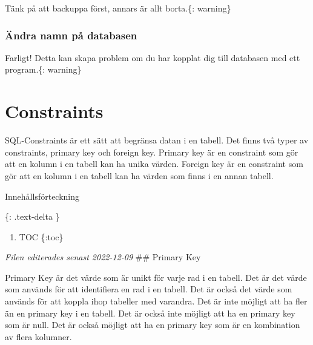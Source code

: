 Tänk på att backuppa först, annars är allt borta.\{: warning\}

\hypertarget{cb3}{}
\begin{Shaded}
\begin{Highlighting}[]
 
\end{Highlighting}
\end{Shaded}

\hypertarget{uxe4ndra-namn-puxe5-databasen}{%
\subsubsection{Ändra namn på
databasen}\label{uxe4ndra-namn-puxe5-databasen}}

Farligt! Detta kan skapa problem om du har kopplat dig till databasen
med ett program.\{: warning\}

\hypertarget{cb4}{}
\begin{Shaded}
\begin{Highlighting}[]
  
\end{Highlighting}
\end{Shaded}

\hypertarget{constraints}{%
\section{Constraints}\label{constraints}}

SQL-Constraints är ett sätt att begränsa datan i en tabell. Det finns
två typer av constraints, primary key och foreign key. Primary key är en
constraint som gör att en kolumn i en tabell kan ha unika värden.
Foreign key är en constraint som gör att en kolumn i en tabell kan ha
värden som finns i en annan tabell.

Innehållsförteckning

\{: .text-delta \}

\begin{enumerate}
\def\labelenumi{\arabic{enumi}.}
\tightlist
\item
  TOC \{:toc\}
\end{enumerate}

\emph{Filen editerades senast 2022-12-09} \#\# Primary Key

Primary Key är det värde som är unikt för varje rad i en tabell. Det är
det värde som används för att identifiera en rad i en tabell. Det är
också det värde som används för att koppla ihop tabeller med varandra.
Det är inte möjligt att ha fler än en primary key i en tabell. Det är
också inte möjligt att ha en primary key som är null. Det är också
möjligt att ha en primary key som är en kombination av flera kolumner.

